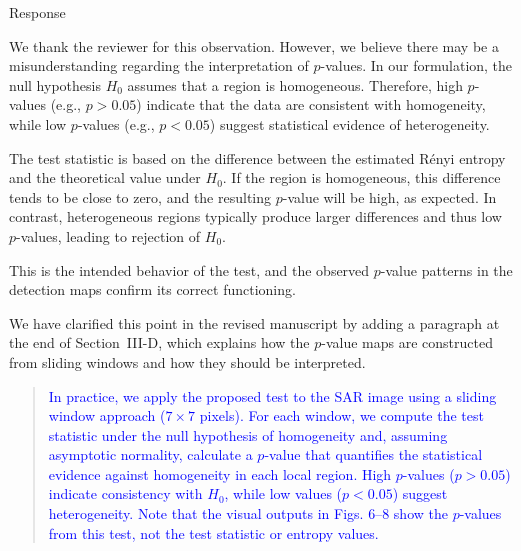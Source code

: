 \documentclass[11pt]{report}
\begin{document}
\begin{responsebox}{Response}

We thank the reviewer for this observation. However, we believe there may be a misunderstanding regarding the interpretation of $p$-values. In our formulation, the null hypothesis $H_0$ assumes that a region is homogeneous. Therefore, high $p$-values (e.g., $p > 0.05$) indicate that the data are consistent with homogeneity, while low $p$-values (e.g., $p < 0.05$) suggest statistical evidence of heterogeneity.

The test statistic is based on the difference between the estimated Rényi entropy and the theoretical value under $H_0$. If the region is homogeneous, this difference tends to be close to zero, and the resulting $p$-value will be high, as expected. In contrast, heterogeneous regions typically produce larger differences and thus low $p$-values, leading to rejection of $H_0$.

This is the intended behavior of the test, and the observed $p$-value patterns in the detection maps confirm its correct functioning. 
\end{responsebox}
\begin{responsebox}{}
We have clarified this point in the revised manuscript by adding a paragraph at the end of Section~III-D,  which explains how the $p$-value maps are constructed from sliding windows and how they should be interpreted.

\begin{quote}
\textcolor{blue}{
In practice, we apply the proposed test to the SAR image using a sliding window approach ($7 \times 7$ pixels). For each window, we compute the test statistic under the null hypothesis of homogeneity and, assuming asymptotic normality, calculate a $p$-value that quantifies the statistical evidence against homogeneity in each local region. High $p$-values ($p > 0.05$) indicate consistency with $H_0$, while low values ($p < 0.05$) suggest heterogeneity. 
Note that the visual outputs in Figs. 6--8 show the $p$-values from this test, not the test statistic or entropy values.
}
\end{quote}
\end{responsebox}
\end{document}
